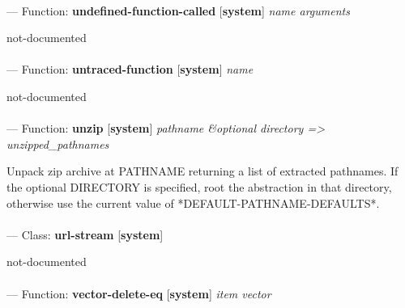\paragraph{}
\label{SYSTEM:UNDEFINED-FUNCTION-CALLED}
--- Function: \textbf{undefined-function-called} [\textbf{system}] \textit{name arguments}

\begin{adjustwidth}{5em}{5em}
not-documented
\end{adjustwidth}

\paragraph{}
\label{SYSTEM:UNTRACED-FUNCTION}
--- Function: \textbf{untraced-function} [\textbf{system}] \textit{name}

\begin{adjustwidth}{5em}{5em}
not-documented
\end{adjustwidth}

\paragraph{}
\label{SYSTEM:UNZIP}
--- Function: \textbf{unzip} [\textbf{system}] \textit{pathname \&optional directory => unzipped\_pathnames}

\begin{adjustwidth}{5em}{5em}
Unpack zip archive at PATHNAME returning a list of extracted pathnames.
If the optional DIRECTORY is specified, root the abstraction in that directory, otherwise use the current value of *DEFAULT-PATHNAME-DEFAULTS*.
\end{adjustwidth}

\paragraph{}
\label{SYSTEM:URL-STREAM}
--- Class: \textbf{url-stream} [\textbf{system}] \textit{}

\begin{adjustwidth}{5em}{5em}
not-documented
\end{adjustwidth}

\paragraph{}
\label{SYSTEM:VECTOR-DELETE-EQ}
--- Function: \textbf{vector-delete-eq} [\textbf{system}] \textit{item vector}

